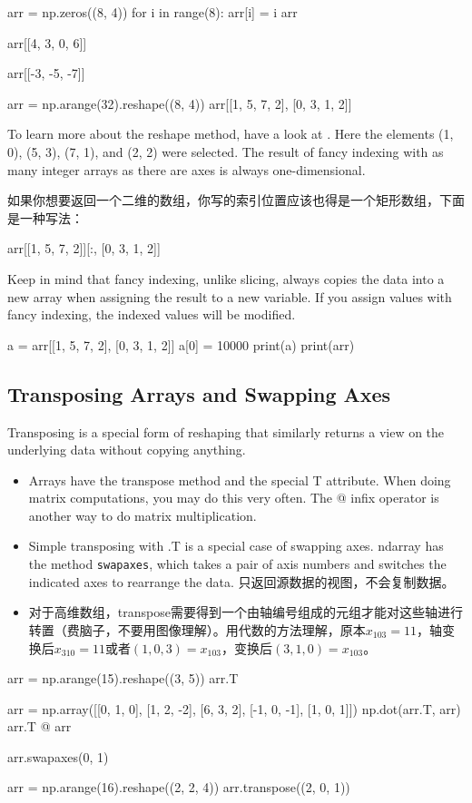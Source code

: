 \begin{pyc}
arr = np.zeros((8, 4))
for i in range(8):
    arr[i] = i
arr

arr[[4, 3, 0, 6]]

arr[[-3, -5, -7]]

arr = np.arange(32).reshape((8, 4))
arr[[1, 5, 7, 2], [0, 3, 1, 2]]
\end{pyc}

To learn more about the reshape method, have a look at . Here the elements (1, 0), (5, 3), (7, 1), and (2, 2) were selected. The result of fancy indexing with as many integer arrays as there are axes is always one-dimensional.

如果你想要返回一个二维的数组，你写的索引位置应该也得是一个矩形数组，下面是一种写法：
\begin{pyc}
arr[[1, 5, 7, 2]][:, [0, 3, 1, 2]]
\end{pyc}

Keep in mind that fancy indexing, unlike slicing, always copies the data into a new array when assigning the result to a new variable. If you assign values with fancy indexing, the indexed values will be modified.

\begin{pyc}
a = arr[[1, 5, 7, 2], [0, 3, 1, 2]]
a[0] = 10000
print(a)
print(arr)
\end{pyc}
\subsection{Transposing Arrays and Swapping Axes}
Transposing is a special form of reshaping that similarly returns a view on the underlying data without copying anything.
\begin{itemize}
    \item Arrays have the transpose method and the special T attribute. When doing matrix computations, you may do this very often. The @ infix operator is another way to do matrix multiplication.
    \item Simple transposing with .T is a special case of swapping axes. ndarray has the method \verb|swapaxes|, which takes a pair of axis numbers and switches the indicated axes to rearrange the data. 只返回源数据的视图，不会复制数据。
    \item 对于高维数组，transpose需要得到一个由轴编号组成的元组才能对这些轴进行转置（费脑子，不要用图像理解）。用代数的方法理解，原本$x_{103}=11$，轴变换后$x_{310}=11$或者$(1, 0, 3)=x_{103}$，变换后$(3, 1, 0)=x_{103}$。
\end{itemize}
\begin{pyc}
arr = np.arange(15).reshape((3, 5))
arr.T

arr = np.array([[0, 1, 0], [1, 2, -2], [6, 3, 2], [-1, 0, -1], [1, 0, 1]])
np.dot(arr.T, arr)
arr.T @ arr

arr.swapaxes(0, 1)

arr = np.arange(16).reshape((2, 2, 4))
arr.transpose((2, 0, 1))
\end{pyc}
